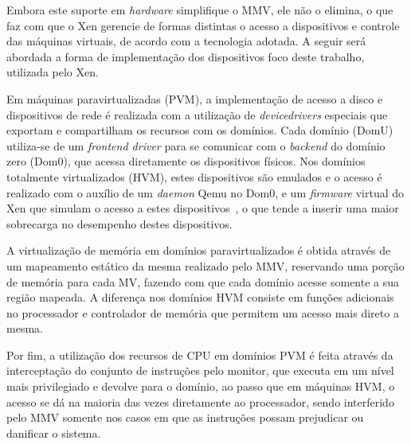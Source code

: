 \documentclass[times, 10pt,twocolumn]{article}
\def\hw{\textit{hardware}\xspace}
\def\dd{\textit{device}\xspace\textit{drivers}\xspace}
\begin{document}
Embora este suporte em \hw simplifique o MMV, ele não o elimina, o que faz com que o
Xen gerencie de formas distintas o acesso a dispositivos e controle das máquinas virtuais,
de acordo com a tecnologia adotada. A seguir será abordada a forma de implementação 
dos dispositivos foco deste trabalho, utilizada pelo Xen.

Em máquinas paravirtualizadas (PVM), a implementação de acesso a disco e dispositivos
de rede é realizada com a utilização de \dd especiais que exportam e compartilham os
recursos com os domínios. Cada domínio (DomU) utiliza-se de um \textit{frontend driver}
para se comunicar com o \textit{backend} do domínio zero (Dom0), que  acessa 
diretamente os dispositivos físicos. Nos domínios totalmente virtualizados (HVM), 
estes dispositivos são emulados e o acesso é realizado com o auxílio de um 
\textit{daemon} Qemu no Dom0, e um \textit{firmware} virtual do Xen que simulam o 
acesso a estes dispositivos~\cite{arqxen}, o que tende a inserir uma maior 
sobrecarga  no desempenho destes dispositivos.


A virtualização de memória em domínios paravirtualizados é obtida através de um
mapeamento estático da mesma realizado pelo MMV, reservando uma porção de memória
para cada MV, fazendo com que cada domínio acesse somente a sua região mapeada. A 
diferença nos domínios HVM consiste em funções adicionais no processador e controlador
de memória que permitem um acesso mais direto a mesma. 


Por fim, a utilização dos recursos de CPU em domínios PVM é feita através da 
interceptação do conjunto de instruções pelo monitor, que executa em um nível 
mais privilegiado e devolve para o domínio, ao passo que em máquinas HVM, o 
acesso se dá na maioria das vezes diretamente ao processador, sendo interferido 
pelo MMV somente nos casos em que as instruções possam prejudicar ou danificar o sistema. 
\end{document}
